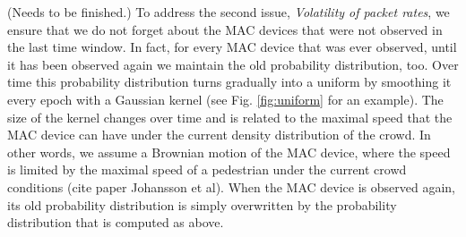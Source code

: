 \documentclass[10pt,a4paper]{article}
\begin{document}
(Needs to be finished.)
To address the second issue, {\it Volatility of packet rates}, we ensure that we do not forget about the MAC devices that were not observed in the last time window. In fact, for every MAC device that was ever observed, until it has been observed again we maintain the old probability distribution, too. Over time this probability distribution turns gradually into a uniform by smoothing it every epoch with a Gaussian kernel (see Fig. \ref{fig:uniform} for an example). The size of the kernel changes over time and is related to the maximal speed that the MAC device can have under the current density distribution of the crowd. In other words, we assume a Brownian motion of the MAC device, where the speed is limited by the maximal speed of a pedestrian under the current crowd conditions (cite paper Johansson et al). When the MAC device is observed again, its old probability distribution is simply overwritten by the probability distribution that is computed as above.

\end{document}
